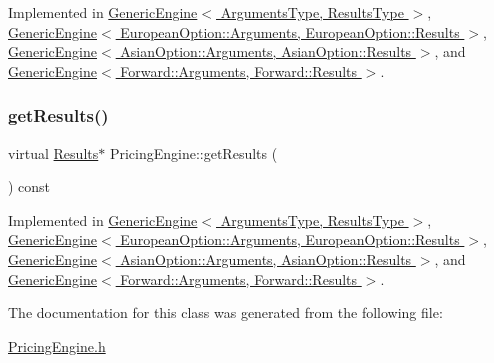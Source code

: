 Implemented in \hyperlink{class_generic_engine_ac2adcbbc8d7b554e2cc1f90e4c4d055d}{Generic\+Engine$<$ Arguments\+Type, Results\+Type $>$}, \hyperlink{class_generic_engine_ac2adcbbc8d7b554e2cc1f90e4c4d055d}{Generic\+Engine$<$ European\+Option\+::\+Arguments, European\+Option\+::\+Results $>$}, \hyperlink{class_generic_engine_ac2adcbbc8d7b554e2cc1f90e4c4d055d}{Generic\+Engine$<$ Asian\+Option\+::\+Arguments, Asian\+Option\+::\+Results $>$}, and \hyperlink{class_generic_engine_ac2adcbbc8d7b554e2cc1f90e4c4d055d}{Generic\+Engine$<$ Forward\+::\+Arguments, Forward\+::\+Results $>$}.

\hypertarget{class_pricing_engine_a73e2852ef4c28e92a402492e86717d0b}{}\label{class_pricing_engine_a73e2852ef4c28e92a402492e86717d0b} 
\subsubsection{\texorpdfstring{get\+Results()}{getResults()}}
{\footnotesize\ttfamily virtual \hyperlink{class_pricing_engine_1_1_results}{Results}$\ast$ Pricing\+Engine\+::get\+Results (\begin{DoxyParamCaption}{ }\end{DoxyParamCaption}) const\hspace{0.3cm}{\ttfamily [pure virtual]}}



Implemented in \hyperlink{class_generic_engine_a2b8d7fba7e51c0795ea9f1e9c2f54afd}{Generic\+Engine$<$ Arguments\+Type, Results\+Type $>$}, \hyperlink{class_generic_engine_a2b8d7fba7e51c0795ea9f1e9c2f54afd}{Generic\+Engine$<$ European\+Option\+::\+Arguments, European\+Option\+::\+Results $>$}, \hyperlink{class_generic_engine_a2b8d7fba7e51c0795ea9f1e9c2f54afd}{Generic\+Engine$<$ Asian\+Option\+::\+Arguments, Asian\+Option\+::\+Results $>$}, and \hyperlink{class_generic_engine_a2b8d7fba7e51c0795ea9f1e9c2f54afd}{Generic\+Engine$<$ Forward\+::\+Arguments, Forward\+::\+Results $>$}.



The documentation for this class was generated from the following file\+:\begin{DoxyCompactItemize}
\item 
\hyperlink{_pricing_engine_8h}{Pricing\+Engine.\+h}\end{DoxyCompactItemize}
